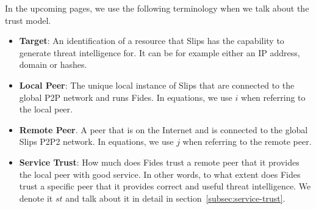 \vspace{1cm}

\noindent
In the upcoming pages, we use the following terminology when we talk about the trust model.

\begin{itemize}

\item \textbf{Target}: An identification of a resource that Slips has the capability to generate threat intelligence for. It can be for example either an IP address, domain or hashes.

\item \textbf{Local Peer}: The unique local instance of Slips that are connected to the global P2P network and runs Fides. In equations, we use $i$ when referring to the local peer.

\item \textbf{Remote Peer}. A peer that is on the Internet and is connected to the global Slips P2P2 network. In equations, we use $j$ when referring to the remote peer.

\item \textbf{Service Trust}: How much does Fides trust a remote peer that it provides the local peer with good service. In other words, to what extent does Fides trust a specific peer that it provides correct and useful threat intelligence. We denote it $st$ and talk about it in detail in section~\ref{subsec:service-trust}.

\end{itemize}











